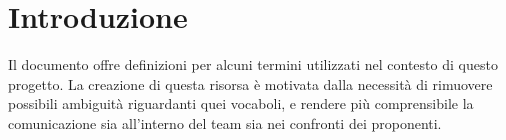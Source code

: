 \chapter{Introduzione}\label{chap:intro}

Il documento offre definizioni per alcuni termini utilizzati nel contesto di questo progetto. La creazione di questa risorsa è motivata dalla necessità di rimuovere possibili ambiguità riguardanti quei vocaboli, e rendere più comprensibile la comunicazione sia all'interno del team sia nei confronti dei proponenti.